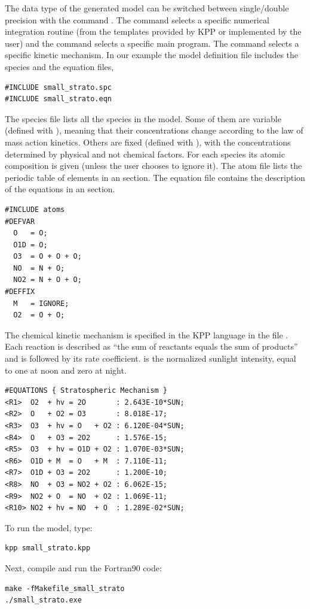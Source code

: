 \documentclass[twoside]{article}
\begin{document}
The data type of the generated model can be switched between
single/double precision with the command . The
 command selects a specific numerical integration
routine (from the templates provided by KPP or implemented by the user)
and the  command selects a specific main program. The
 command selects a specific kinetic mechanism. In our
example the model definition file  includes the
species and the equation files,
%
\begin{verbatim}
#INCLUDE small_strato.spc
#INCLUDE small_strato.eqn
\end{verbatim}
%
The species file lists all the species in the model. Some of them are
variable (defined with ), meaning that their
concentrations change according to the law of mass action kinetics.
Others are fixed (defined with ), with the concentrations
determined by physical and not chemical factors. For each species its
atomic composition is given (unless the user chooses to ignore it). The
atom file lists the periodic table of elements in an 
section. The equation file contains the description of the equations in
an  section.
%
\begin{verbatim}
#INCLUDE atoms
#DEFVAR
  O   = O;
  O1D = O;
  O3  = O + O + O;
  NO  = N + O;
  NO2 = N + O + O;
#DEFFIX
  M   = IGNORE;
  O2  = O + O;
\end{verbatim}
%
The chemical kinetic mechanism is specified in the KPP language in the
file . Each reaction is described as ``the sum of
reactants equals the sum of products'' and is followed by its rate
coefficient.  is the normalized sunlight intensity, equal to
one at noon and zero at night.
%
\begin{verbatim}
#EQUATIONS { Stratospheric Mechanism }
<R1>  O2  + hv = 2O       : 2.643E-10*SUN;
<R2>  O   + O2 = O3       : 8.018E-17;
<R3>  O3  + hv = O   + O2 : 6.120E-04*SUN;
<R4>  O   + O3 = 2O2      : 1.576E-15;
<R5>  O3  + hv = O1D + O2 : 1.070E-03*SUN;
<R6>  O1D + M  = O   + M  : 7.110E-11;
<R7>  O1D + O3 = 2O2      : 1.200E-10;
<R8>  NO  + O3 = NO2 + O2 : 6.062E-15;
<R9>  NO2 + O  = NO  + O2 : 1.069E-11;
<R10> NO2 + hv = NO  + O  : 1.289E-02*SUN;
\end{verbatim}
%
To run the model, type:
%
\begin{verbatim}
kpp small_strato.kpp
\end{verbatim}
%
Next, compile and run the Fortran90 code:
%
\begin{verbatim}
make -fMakefile_small_strato
./small_strato.exe
\end{verbatim}
%
\end{document}
